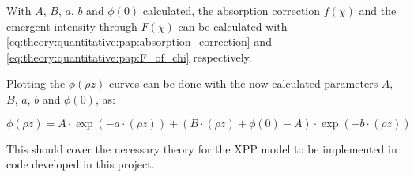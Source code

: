 With $A$, $B$, $a$, $b$ and $\phi(0)$ calculated, the absorption correction $f(\chi)$ and the emergent intensity through $F(\chi)$ can be calculated with \cref{eq:theory:quantitative:pap:absorption_correction} and \cref{eq:theory:quantitative:pap:F_of_chi} respectively.

Plotting the $\phi(\rho z)$ curves can be done with the now calculated parameters $A$, $B$, $a$, $b$ and $\phi(0)$, as:

\begin{equation}
    \label{eq:theory:quantitative:pap:phi_of_rho_z}
    \phi (\rho z) = A \cdot \exp(- a \cdot (\rho z)) + (B \cdot (\rho z) + \phi(0) - A) \cdot \exp(- b \cdot (\rho z))
\end{equation}


This should cover the necessary theory for the XPP model to be implemented in code developed in this project.